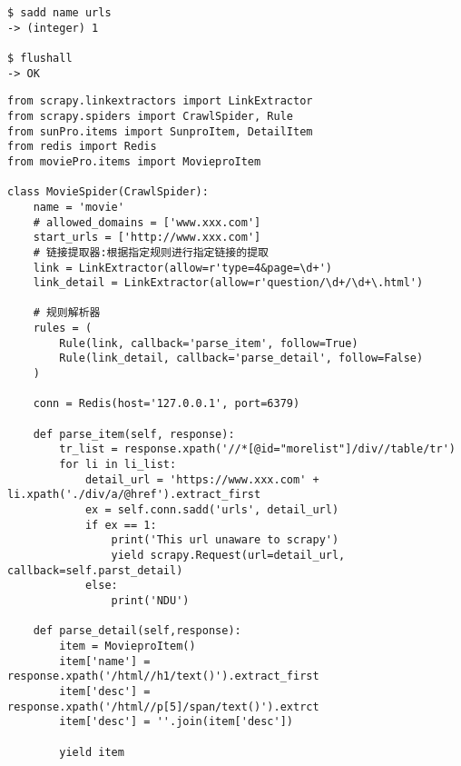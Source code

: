 \documentclass[a4paper,11pt]{ctexart}    %
\begin{document}
\begin{tcolorbox}[
         colback=red!5!white,
         colframe=teal,
         title=\textbf{redis Database shell}
    ]
\begin{verbatim}
$ sadd name urls
-> (integer) 1

$ flushall
-> OK
\end{verbatim}
\end{tcolorbox}

\begin{tcolorbox}[
         colback=red!5!white,
         colframe=teal,
         title=\textbf{main.py}
    ]
\begin{verbatim}
from scrapy.linkextractors import LinkExtractor
from scrapy.spiders import CrawlSpider, Rule
from sunPro.items import SunproItem, DetailItem
from redis import Redis
from moviePro.items import MovieproItem

class MovieSpider(CrawlSpider):
    name = 'movie'
    # allowed_domains = ['www.xxx.com']
    start_urls = ['http://www.xxx.com']
    # 链接提取器:根据指定规则进行指定链接的提取
    link = LinkExtractor(allow=r'type=4&page=\d+')
    link_detail = LinkExtractor(allow=r'question/\d+/\d+\.html')

    # 规则解析器
    rules = (
        Rule(link, callback='parse_item', follow=True)
        Rule(link_detail, callback='parse_detail', follow=False)
    )

    conn = Redis(host='127.0.0.1', port=6379)

    def parse_item(self, response):
        tr_list = response.xpath('//*[@id="morelist"]/div//table/tr')
        for li in li_list:
            detail_url = 'https://www.xxx.com' + li.xpath('./div/a/@href').extract_first
            ex = self.conn.sadd('urls', detail_url)
            if ex == 1:
                print('This url unaware to scrapy')
                yield scrapy.Request(url=detail_url, callback=self.parst_detail)
            else:
                print('NDU')

    def parse_detail(self,response):
        item = MovieproItem()
        item['name'] = response.xpath('/html//h1/text()').extract_first
        item['desc'] = response.xpath('/html//p[5]/span/text()').extrct
        item['desc'] = ''.join(item['desc'])

        yield item
\end{verbatim}
\end{tcolorbox}
\end{document}
